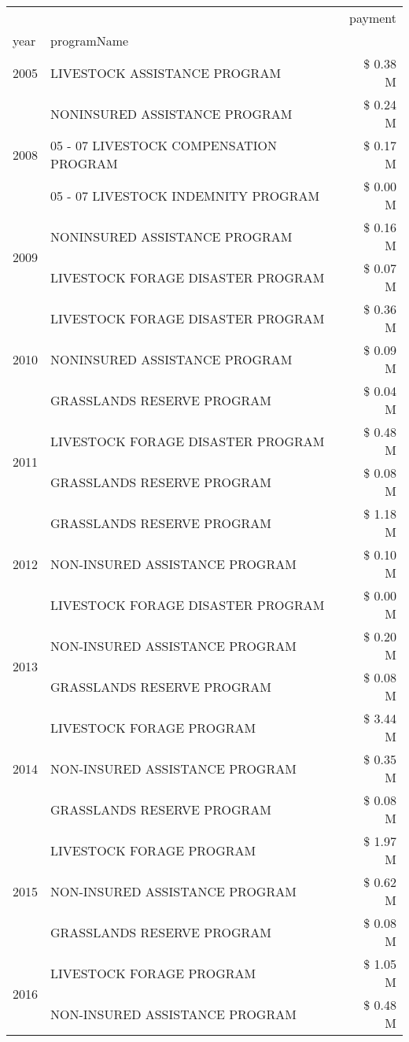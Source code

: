 \begin{tabular}{llr}
\toprule
 &  & payment \\
year & programName &  \\
\midrule
2005 & LIVESTOCK ASSISTANCE PROGRAM & \$ 0.38 M \\
\cline{1-3}
\multirow[t]{3}{*}{2008} & NONINSURED ASSISTANCE PROGRAM & \$ 0.24 M \\
 & 05 - 07 LIVESTOCK COMPENSATION PROGRAM & \$ 0.17 M \\
 & 05 - 07 LIVESTOCK INDEMNITY PROGRAM & \$ 0.00 M \\
\cline{1-3}
\multirow[t]{2}{*}{2009} & NONINSURED ASSISTANCE PROGRAM & \$ 0.16 M \\
 & LIVESTOCK FORAGE DISASTER  PROGRAM & \$ 0.07 M \\
\cline{1-3}
\multirow[t]{3}{*}{2010} & LIVESTOCK FORAGE DISASTER PROGRAM & \$ 0.36 M \\
 & NONINSURED ASSISTANCE PROGRAM & \$ 0.09 M \\
 & GRASSLANDS RESERVE PROGRAM & \$ 0.04 M \\
\cline{1-3}
\multirow[t]{2}{*}{2011} & LIVESTOCK FORAGE DISASTER PROGRAM & \$ 0.48 M \\
 & GRASSLANDS RESERVE PROGRAM & \$ 0.08 M \\
\cline{1-3}
\multirow[t]{3}{*}{2012} & GRASSLANDS RESERVE PROGRAM & \$ 1.18 M \\
 & NON-INSURED ASSISTANCE PROGRAM & \$ 0.10 M \\
 & LIVESTOCK FORAGE DISASTER PROGRAM & \$ 0.00 M \\
\cline{1-3}
\multirow[t]{2}{*}{2013} & NON-INSURED ASSISTANCE PROGRAM & \$ 0.20 M \\
 & GRASSLANDS RESERVE PROGRAM & \$ 0.08 M \\
\cline{1-3}
\multirow[t]{3}{*}{2014} & LIVESTOCK FORAGE PROGRAM & \$ 3.44 M \\
 & NON-INSURED ASSISTANCE PROGRAM & \$ 0.35 M \\
 & GRASSLANDS RESERVE PROGRAM & \$ 0.08 M \\
\cline{1-3}
\multirow[t]{3}{*}{2015} & LIVESTOCK FORAGE PROGRAM & \$ 1.97 M \\
 & NON-INSURED ASSISTANCE PROGRAM & \$ 0.62 M \\
 & GRASSLANDS RESERVE PROGRAM & \$ 0.08 M \\
\cline{1-3}
\multirow[t]{3}{*}{2016} & LIVESTOCK FORAGE PROGRAM & \$ 1.05 M \\
 & NON-INSURED ASSISTANCE PROGRAM & \$ 0.48 M \\

\end{tabular}
